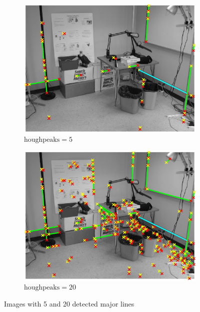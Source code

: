\documentclass[lettersize,journal]{IEEEtran}
\begin{document}
\begin{figure}[h]
    \centering 
     
    \begin{subfigure}[h]{0.23\textwidth}
        \centering 
        \includegraphics[width=\linewidth]{hough_lines_5}
        \caption{$\text{houghpeaks} = 5$}  
    \end{subfigure}
    \begin{subfigure}[h]{0.23\textwidth}
        \centering
        \includegraphics[width=\linewidth]{hough_lines_20}
        \caption{$\text{houghpeaks} = 20$}  
    \end{subfigure}
    \caption{Images with 5 and 20 detected major lines}
    \label{fig:6}
\end{figure}
\end{document}
